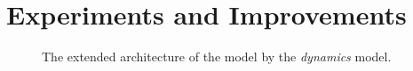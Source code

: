 \chapter{Experiments and Improvements}\label{experiments_and_improvements}

\begin{figure}[!ht]
\centering

\caption[The extended architecture of the model.]{The extended architecture of the model by the \emph{dynamics} model.}
\end{figure}
 
